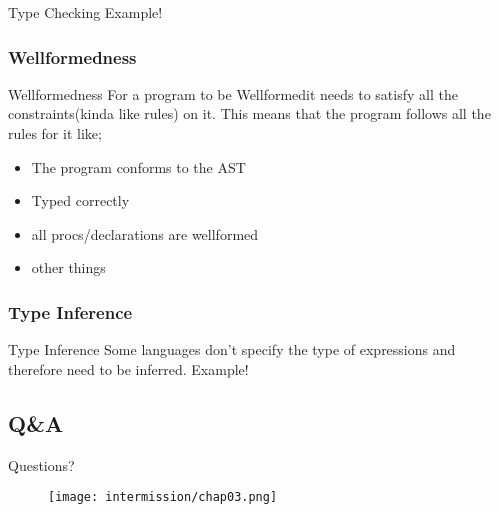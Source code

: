 \begin{frame}{Type Checking}
    Example!

\end{frame}

\subsubsection*{Wellformedness}
\begin{frame}{Wellformedness}
    For a program to be Wellformedit needs to satisfy all the constraints(kinda like rules) on it. This
    means that the program follows all the rules for it like;
    \begin{itemize}
        \item The program conforms to the AST
        \item Typed correctly
        \item all procs/declarations are wellformed
        \item other things
    \end{itemize}
\end{frame}

\subsubsection*{Type Inference}
\begin{frame}{Type Inference}
    Some languages don't specify the type of expressions and therefore need to be inferred.
    Example!
\end{frame}

\subsection*{Q\&A}
\begin{frame}{Questions?}
    \begin{figure}
        \centering
        \texttt{[image: intermission/chap03.png]}
    \end{figure}
\end{frame}